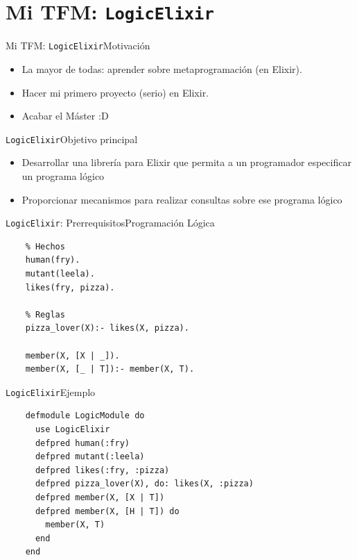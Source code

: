 \documentclass[14pt,aspectratio=169]{beamer}
\begin{document}
\section{Mi TFM: \texttt{LogicElixir}}
\begin{frame}{Mi TFM: \texttt{LogicElixir}}{Motivación}
  \begin{itemize}
    \item La mayor de todas: aprender sobre metaprogramación (en Elixir).
    \item Hacer mi primero proyecto (serio) en Elixir.
    \item Acabar el Máster :D
  \end{itemize}
\end{frame}

\begin{frame}{\texttt{LogicElixir}}{Objetivo principal}
  \begin{itemize}
    \item Desarrollar una librería para Elixir que permita
    a un programador especificar un programa lógico
    \item Proporcionar mecanismos para realizar consultas sobre
    ese programa lógico
  \end{itemize}
\end{frame}

\begin{frame}[fragile]{\texttt{LogicElixir}: Prerrequisitos}{Programación Lógica}
  \begin{verbatim}
    % Hechos
    human(fry).
    mutant(leela).
    likes(fry, pizza).

    % Reglas
    pizza_lover(X):- likes(X, pizza).

    member(X, [X | _]).
    member(X, [_ | T]):- member(X, T).

  \end{verbatim}
\end{frame}

\begin{frame}[fragile]{\texttt{LogicElixir}}{Ejemplo}
  \small \begin{verbatim}
    defmodule LogicModule do
      use LogicElixir
      defpred human(:fry)
      defpred mutant(:leela)
      defpred likes(:fry, :pizza)
      defpred pizza_lover(X), do: likes(X, :pizza)
      defpred member(X, [X | T])
      defpred member(X, [H | T]) do
        member(X, T)
      end
    end
  \end{verbatim}
\end{frame}
\end{document}

